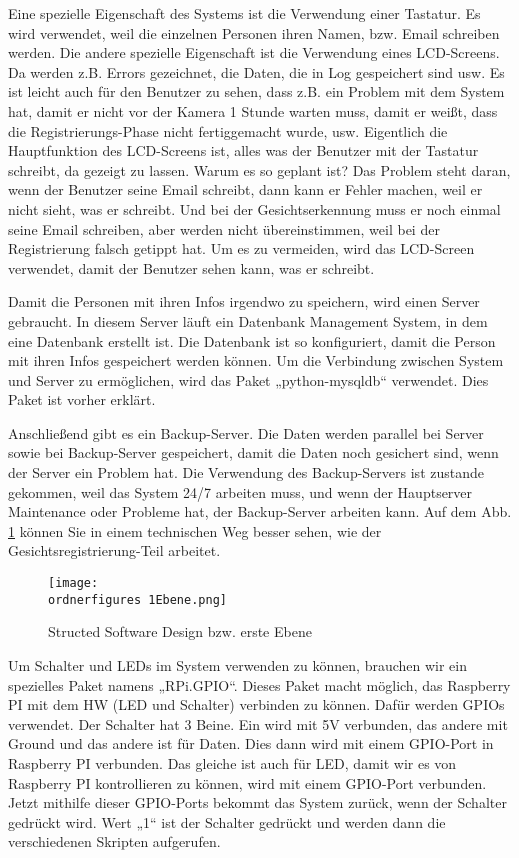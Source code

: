 Eine spezielle Eigenschaft des Systems ist die Verwendung einer Tastatur. Es wird verwendet, weil die einzelnen Personen ihren Namen, bzw. Email schreiben werden. 
Die andere spezielle Eigenschaft ist die Verwendung eines LCD-Screens. Da werden z.B. Errors gezeichnet, die Daten, die in Log gespeichert sind usw. Es ist leicht auch für den Benutzer zu sehen, dass z.B. ein Problem mit dem System hat, damit er nicht vor der Kamera 1 Stunde warten muss, damit er weißt, dass die Registrierungs-Phase nicht fertiggemacht wurde, usw. Eigentlich die Hauptfunktion des LCD-Screens ist, alles was der Benutzer mit der Tastatur schreibt, da gezeigt zu lassen. Warum es so geplant ist? Das Problem steht daran, wenn der Benutzer seine Email schreibt, dann kann er Fehler machen, weil er nicht sieht, was er schreibt. Und bei der Gesichtserkennung muss er noch einmal seine Email schreiben, aber werden nicht übereinstimmen, weil bei der Registrierung falsch getippt hat. Um es zu vermeiden, wird das LCD-Screen verwendet, damit der Benutzer sehen kann, was er schreibt.

Damit die Personen mit ihren Infos irgendwo zu speichern, wird einen Server gebraucht. In diesem Server läuft ein Datenbank Management System, in dem eine Datenbank erstellt ist. Die Datenbank ist so konfiguriert, damit die Person mit ihren Infos gespeichert werden können. Um die Verbindung zwischen System und Server zu ermöglichen, wird das Paket „python-mysqldb“ verwendet. Dies Paket ist vorher erklärt.

 Anschließend gibt es ein Backup-Server. Die Daten werden parallel bei Server sowie bei Backup-Server gespeichert, damit die Daten noch gesichert sind, wenn der Server ein Problem hat. Die Verwendung des Backup-Servers ist zustande gekommen, weil das System 24/7 arbeiten muss, und wenn der Hauptserver Maintenance oder Probleme hat, der Backup-Server arbeiten kann. Auf dem Abb. \ref{fig:1Ebene_Gesichtsregistrierung} können Sie in einem technischen Weg besser sehen, wie der Gesichtsregistrierung-Teil arbeitet. 
\begin{figure}[H]
	\texttt{[image: \\ordnerfigures 1Ebene.png]}
	\caption{Structed Software Design bzw. erste Ebene }
	\label{fig:1Ebene_Gesichtsregistrierung}
\end{figure}
Um Schalter und LEDs im System verwenden zu können, brauchen wir ein spezielles Paket namens „RPi.GPIO“. Dieses Paket macht möglich, das Raspberry PI mit dem HW (LED und Schalter) verbinden zu können. Dafür werden GPIOs verwendet. Der Schalter hat 3 Beine. Ein wird mit 5V verbunden, das andere mit Ground und das andere ist für Daten. Dies dann wird mit einem GPIO-Port in Raspberry PI verbunden. Das gleiche ist auch für LED, damit wir es von Raspberry PI kontrollieren zu können, wird mit einem GPIO-Port verbunden. Jetzt mithilfe dieser GPIO-Ports bekommt das System zurück, wenn der Schalter gedrückt wird. Wert „1“ ist der Schalter gedrückt und werden dann die verschiedenen Skripten aufgerufen. 

